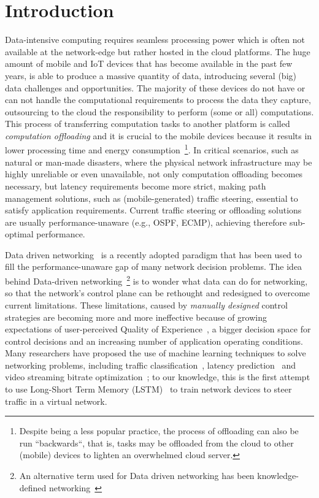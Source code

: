 \chapter{Introduction}
\label{ch:introduction}

Data-intensive computing requires seamless processing power which is often not available at the network-edge but rather hosted in the cloud platforms. The huge amount of mobile and IoT devices that has become available in the past few years, is able to produce a massive quantity of data, introducing several (big) data challenges and opportunities. The majority of these devices do not have or can not handle the computational requirements to process the data they capture, outsourcing to the cloud the responsibility to perform (some or all) computations. This process of transferring computation tasks to another platform is called {\it computation offloading} and it is crucial to the mobile devices because it results in lower processing time and energy consumption~\footnote{Despite being a less popular practice, the process of offloading can also be run ``backwards``, that is, tasks may be offloaded from the cloud to other (mobile) devices to lighten an overwhelmed cloud server.}.  In critical scenarios, such as natural or man-made disasters, where the physical network infrastructure may be highly unreliable or even unavailable, not only computation offloading becomes necessary, but latency requirements become more strict, making path management solutions, such as (mobile-generated) traffic steering, essential to satisfy application requirements. Current traffic steering or offloading solutions are usually performance-unaware (e.g., OSPF, ECMP), achieving therefore sub-optimal performance. 

Data driven networking~\cite{jiang2017unleashing} is a recently adopted paradigm that has been used to fill the performance-unaware gap of many network decision problems. The idea behind Data-driven networking~\footnote{An alternative term used for Data driven networking has been knowledge-defined networking~\cite{clark2003knowledge,mestres2017knowledge}} is to wonder what data can do for networking, so that the network's control plane can be rethought and redesigned to overcome current limitations. These limitations, caused by \textit{manually designed} control strategies are becoming more and more ineffective because of  growing expectations of user-perceived Quality of Experience~\cite{jiang2014eona}, a bigger decision space for control decisions and an increasing number of application operating conditions.
Many researchers have proposed the use of machine learning techniques to solve networking problems, including traffic classification~\cite{nguyen2008survey}, latency prediction~\cite{end-to-end} and video streaming bitrate optimization~\cite{mao2017neural}; to our knowledge, this is the first attempt to use Long-Short Term Memory (LSTM)~\cite{hochreiter1997long} to train network devices to steer traffic in a virtual network. 

